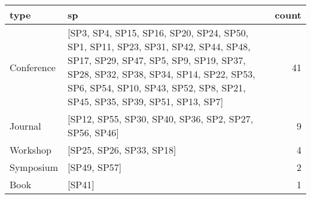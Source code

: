 \begin{tabular}{llr}
\toprule
       type &                                                                                                                                                                                                                                              sp &  count \\
\midrule
 Conference &  [SP3, SP4, SP15, SP16, SP20, SP24, SP50, SP1, SP11, SP23, SP31, SP42, SP44, SP48, SP17, SP29, SP47, SP5, SP9, SP19, SP37, SP28, SP32, SP38, SP34, SP14, SP22, SP53, SP6, SP54, SP10, SP43, SP52, SP8, SP21, SP45, SP35, SP39, SP51, SP13, SP7] &  41 \\
 Journal &  [SP12, SP55, SP30, SP40, SP36, SP2, SP27, SP56, SP46] &  9 \\
 Workshop &  [SP25, SP26, SP33, SP18] &  4 \\
 Symposium &  [SP49, SP57] &  2 \\
 Book &  [SP41] &  1 \\
\bottomrule
\end{tabular}
